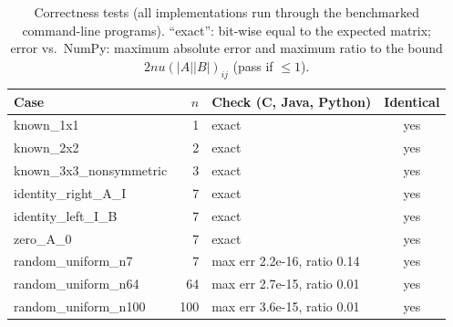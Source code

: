 \begin{table}[t]
\centering
\caption{Correctness tests (all implementations run through the benchmarked command-line programs). ``exact'': bit-wise equal to the expected matrix; error vs.\ NumPy: maximum absolute error and maximum ratio to the bound $2nu(|A||B|)_{ij}$ (pass if $\leq 1$).}
\label{tab:correctness}
\footnotesize
\setlength{\tabcolsep}{3pt}
\begin{tabular}{@{}lrlc@{}}
\toprule
Case & $n$ & Check (C, Java, Python) & Identical \\
\midrule
known\_1x1 & 1 & exact & yes \\
known\_2x2 & 2 & exact & yes \\
known\_3x3\_nonsymmetric & 3 & exact & yes \\
identity\_right\_A\_I & 7 & exact & yes \\
identity\_left\_I\_B & 7 & exact & yes \\
zero\_A\_0 & 7 & exact & yes \\
random\_uniform\_n7 & 7 & max err 2.2e-16, ratio 0.14 & yes \\
random\_uniform\_n64 & 64 & max err 2.7e-15, ratio 0.01 & yes \\
random\_uniform\_n100 & 100 & max err 3.6e-15, ratio 0.01 & yes \\
\bottomrule
\end{tabular}
\end{table}
